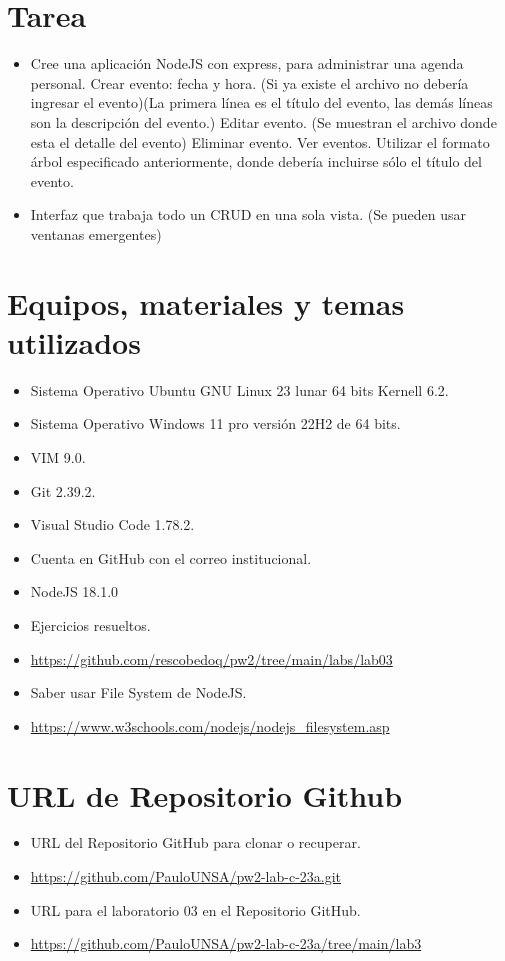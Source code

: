 \documentclass{article}
\begin{document}
	\section{Tarea}
	\begin{itemize}		
		\item  Cree una aplicación NodeJS con express, para administrar una agenda personal.
		\subitem Crear evento: fecha y hora. (Si ya existe el archivo no debería ingresar el evento)(La primera línea es el título del evento, las demás líneas son la descripción del evento.)
		\subitem Editar evento. (Se muestran el archivo  donde esta el detalle del evento)
		\subitem Eliminar evento.
		\subitem Ver eventos. Utilizar el formato árbol especificado anteriormente, donde debería incluirse sólo el título del evento.
		\item Interfaz que trabaja todo un CRUD en una sola vista. (Se pueden usar ventanas emergentes)
	\end{itemize}
		
	\section{Equipos, materiales y temas utilizados}
	\begin{itemize}
		\item Sistema Operativo Ubuntu GNU Linux 23 lunar 64 bits Kernell 6.2.
		\item Sistema Operativo Windows 11 pro versión 22H2 de 64 bits.
		\item VIM 9.0.
		\item Git 2.39.2.
		\item Visual Studio Code 1.78.2.
		\item Cuenta en GitHub con el correo institucional.
		\item NodeJS 18.1.0
		\item Ejercicios resueltos.
		\item \url{https://github.com/rescobedoq/pw2/tree/main/labs/lab03}
		\item Saber usar File System de NodeJS.
		\item \url{https://www.w3schools.com/nodejs/nodejs_filesystem.asp}
	\end{itemize}
	
	\section{URL de Repositorio Github}
	\begin{itemize}
		\item URL del Repositorio GitHub para clonar o recuperar.
		\item \url{https://github.com/PauloUNSA/pw2-lab-c-23a.git}
		\item URL para el laboratorio 03 en el Repositorio GitHub.
		\item \url{https://github.com/PauloUNSA/pw2-lab-c-23a/tree/main/lab3}
	\end{itemize}
	
\end{document}

